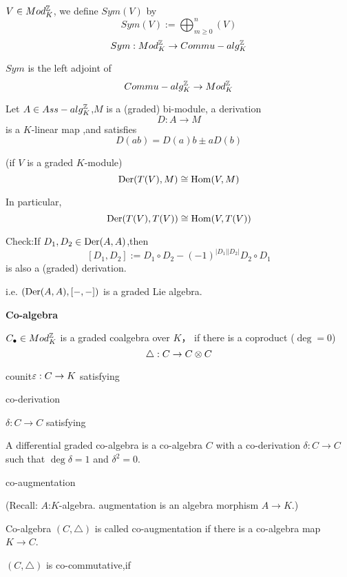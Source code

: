 \begin{definition}
$V\in Mod_K^{\mathbb{Z}}$, we define $Sym(V)$ by
$$Sym(V):=\bigoplus_{m\geq 0}^n(V)$$
$$Sym:Mod_K^{\mathbb{Z}}\to Commu-alg_K^{\mathbb{Z}}$$
\end{definition}

\begin{prop}
$Sym$ is the left adjoint of
$$Commu-alg_K^{\mathbb{Z}}\to Mod_K^{\mathbb{Z}}$$
\end{prop}

Let $A\in Ass-alg_K^{\mathbb{Z}}$,$M$ is a (graded) bi-module,
a derivation
$$D:A\to M$$
is a $K$-linear map ,and satisfies
$$D(ab)=D(a)b\pm aD(b)$$


\begin{prop}(if $V$ is a graded $K$-module)
$$\operatorname{Der}(T(V),M)\cong\operatorname{Hom}(V,M)$$
\end{prop}

In particular,
$$\operatorname{Der}(T(V),T(V))\cong\operatorname{Hom}(V,T(V))$$

Check:If $D_1,D_2\in\operatorname{Der}(A,A)$,then
$$[D_1,D_2]:=D_1\circ D_2-(-1)^{|D_1||D_2|}D_2\circ D_1$$
is also a (graded) derivation.

i.e. $(\operatorname{Der}(A,A),[-,-])$ is a graded Lie algebra.

\textbf{Co-algebra}

\begin{definition}
$C_{\bullet}\in Mod_K^{\mathbb{Z}}$ is a graded coalgebra over $K$，
if there is a coproduct ($\deg=0$)
$$\triangle:C\to C\otimes C$$
\end{definition}

counit$\varepsilon:C\to K$ satisfying

co-derivation

$\delta: C\to C$ satisfying

A differential graded co-algebra is a co-algebra
$C$ with a co-derivation $\delta:C\to C$ such that
$\deg\delta=1$ and $\delta^2=0$.

co-augmentation

 (Recall:
 $A$:$K$-algebra. augmentation is an algebra morphism
$A\to K$.)

Co-algebra $(C,\triangle)$ is called co-augmentation if
there is a co-algebra map $K\to C$.

$(C,\triangle)$ is co-commutative,if

